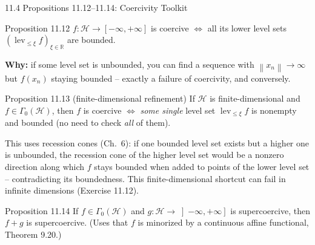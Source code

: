 \documentclass[aspectratio=169,10pt]{beamer}
\newcommand{\mHH}{\mathcal H}
\newcommand{\norm}[1]{\left\|#1\right\|}
\newcommand{\R}{\mathbb{R}}
\newcommand{\lev}{\operatorname{lev}}
\newcommand{\GamZero}{\Gamma_0(\mHH)}
\begin{document}
\begin{frame}{11.4 Propositions 11.12--11.14: Coercivity Toolkit}

  \begin{block}{Proposition 11.12}
    $f:\mHH\to[-\infty,+\infty]$ is coercive $\iff$ all its lower
    level sets $(\lev_{\le\xi}f)_{\xi\in\R}$ are bounded.
  \end{block}
  \textbf{Why:} if some level set is unbounded, you can find a
  sequence with $\norm{x_n}\to\infty$ but $f(x_n)$ staying bounded --
  exactly a failure of coercivity, and conversely.

  \begin{block}{Proposition 11.13 (finite-dimensional refinement)}
    If $\mHH$ is finite-dimensional and $f\in\GamZero$, then $f$ is
    coercive $\iff$ \emph{some single} level set $\lev_{\le\xi}f$ is
    nonempty and bounded (no need to check \emph{all} of them).
  \end{block}
  This uses recession cones (Ch.\ 6): if one bounded level set exists
  but a higher one is unbounded, the recession cone of the higher
  level set would be a nonzero direction along which $f$ stays
  bounded when added to points of the lower level set -- contradicting
  its boundedness. This finite-dimensional shortcut can fail in
  infinite dimensions (Exercise 11.12).

  \begin{block}{Proposition 11.14}
    If $f\in\GamZero$ and $g:\mHH\to\left]-\infty,+\infty\right]$ is
    supercoercive, then $f+g$ is supercoercive. (Uses that $f$ is
    minorized by a continuous affine functional, Theorem 9.20.)
  \end{block}

\end{frame}
\end{document}
